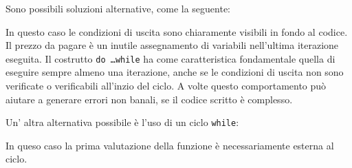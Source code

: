 Sono possibili soluzioni alternative, come la seguente:
\lstset{basicstyle=\scriptsize\sf}

\lstset{basicstyle=\sf}

In questo caso le condizioni di uscita sono chiaramente visibili in fondo al
codice. Il prezzo da pagare \`e un inutile assegnamento di variabili
nell'ultima iterazione eseguita. Il costrutto \texttt{do \ldots while} ha come
caratteristica fondamentale quella di eseguire sempre almeno una iterazione, anche se le condizioni di uscita non sono verificate o 
verificabili all'inzio del ciclo.
A volte questo comportamento pu\`o aiutare a generare errori non banali, se il codice scritto \`e complesso.


Un' altra alternativa possibile \`e l'uso di un ciclo \texttt{while}: 
\lstset{basicstyle=\scriptsize\sf}

\lstset{basicstyle=\sf}
 In queso caso la prima valutazione della funzione \`e necessariamente esterna
 al ciclo.
 
